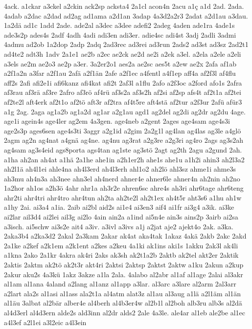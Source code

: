{4ack.
a1ckar
a3ckel
a2ckin
ack2sp
acksta4
2a1cl
acon4n
2acu
a1ç
a1d
2ad.
2ada.
4adab
a2dac
a2dad
ad2ag
ad1ama
a2d1an
3adap
4a3d2a2r3
2adat
a2d1au
a3dau.
1a2dä
ad1c
1add
2ade.
ade2al
a3dec
a3dee
adefi2
2adeg
4aden
ade1ra
4ade1s
ade3s2p
ades4s
2adf
4adh
4adi
adi3en
adi3er.
adie4sc
adi4st
3adj
2adli
3admi
4admu
ad2ob
1a2dop
2adp
2adq
2ad3rec
ad3rei
ad3run
2ads2
ad3st
ad3sz
2ad2t1
ad4te2
adt3h
1adv
2a1e1
ae2b
a2ec
ae2ck
ae2d
ae2i
a2ek
a3el.
a2ela
a2ele
a2eli
a3els
ae2m
ae2o3
ae2p
a3er.
3a2er2o1
aes2a
ae2sc
aes5t
a2ew
ae2x
2afa
af1ab
a2f1a2n
a3far
a2f1au
2afä
a2f1än
2afe
a2f1ec
a4fentl
a4f1ep
aff4a
af2f3l
af4flu
aff2s
2afi
afi2e1i
afi6kanz
afi4kat
afi2t
2af3l
a1flu
2afo
a2f3oc
a2ford
afo1s
2afra
af3rau
af3rä
af3re
2afro
af3rö
af4rü
af3s2a
af3s2h
af2si
af2sp
afs4t
af2t1a
af2tei
af2te2l
aft4erk
af2t1o
af2tö
aft3r
af2tra
af4t5re
aft4stä
af2tur
a2f3ur
2afü
afür3
a1g
2ag.
2aga
ag1a2b
ag1a2d
ag1ar
a2g1au
agd1
ag2del
ag2di
ag2dr
ag2du
4age.
age1i
agein4s
age4ler
ag2em
4a3gen.
age4neb
a2gent
2ages
age4sam
age4s3i
age2s3p
ages6sen
age4s3ti
3aggr
a2g1id
a2gim
2a2g1l
ag4lan
ag4las
ag3le
a4glö
2agm
ag2n
ag4nat
a4gnä
ag4ne.
ag4nu
ag3rat
a2g3re
a2g3ri
ag4ro
2ags
ag3s2ah
ag4sam
ag3s4eid
ags8porta
ags4tan
ag1ste
ag3stö
2agt
ag2th
2agu
a2gund
2ah.
a1ha
ah2an
ah4at
a1hä
2a1he
ahe1in
a2h1er2h
ahe1s
ahe1u
a1h2i
ahin3
ah2l3a2
ah2l1ä
ah4l1ei
ahle4na
ah4l3erd
ah4l3erh
ahl1o2
ah2lö
ahl3sz
ahme1i
ahme3s
ah3mu
ah4n3a
ah3nee
ahn3el
ah4nerd
ahner4e
ahner6le
ahner4n
ah2nin
ah2no
1a2hor
ah1os
a2h3ö
4ahr
ahr1a
ah3r2e
ahren6sc
ahre4s
ah3ri
ahr6tage
ahr6teng
ahr2ti
ahr4tri
ahr4tro
ahr4tun
ah2ta
ah2te2l
ah2t1ex
ah4t5r
aht3s6
a1hu
ah1w
a1hy
2ai.
ai3a4
a1ia.
2aib
ai2bl
aid2s
ai1e4
ai3en3
aif4
ai1fr
ai3g4
a3ik.
ai3ke
ai2lar
ail3d4
ai2lei
ail3g
ai2lo
4ain
ain2a
a1ind
ai5n4e
ain3s
ains2p
3airb
ai2sa
a3isch.
ai5schw
ai3s2e
ait4
a3iv.
a3ivl
a3ivs
a1j
a2jat
aje2
ajekt4o
2ak.
a3ka.
2aka3b4
a2ka3d2
2akal
2a3kam
2akar
ak4at
aka4tak
1akaz
4akä
2akb
2akc
2akd
2a1ke
a2kef
a2k1em
a2k1ent
a2kes
a2keu
4a1ki
ak1ins
aki1s
1akku
2ak3l
ak4li
a1kna
2ako
2a1kr
4akra
ak4ri
2aks
ak3sh
ak2t1a2b
2aktb
ak2tel
akt2er
2aktik
2aktis
2aktm
ak2tö
ak2t3r
akt4ri
2aktsi
2aktsp
2aktst
2aktw
a1ku
2akun
a2kup
2akur
aku2s
4a3kü
1akz
3akze
a1la
2ala.
4alabo
al2abr
al1af
al1age
2alai
al3akr
al1am
al1ana
4aland
a2lang
al1anz
al1app
a3lar.
al3arc
a3lare
al2arm
2al3arr
a2lart
ala2s
al1asi
al1ass
ala2t1a
al4atm
alat3z
al1au
al3aug
a1lä
a2l1äm
al1än
al1äu
3albat
al2bär
alber4e
al4berh
al4b3er4w
al2b1l
al2boh
alb3ru
alb3s
al2dä
al4d3erl
al4d3ern
alde2s
ald3inn
al2dr
alds2
2ale
4a3le.
ale4ar
al1eb
ale2be
al1ec
a4l3ef
a2l1ei
a3l2eic
a4l3ein
}
